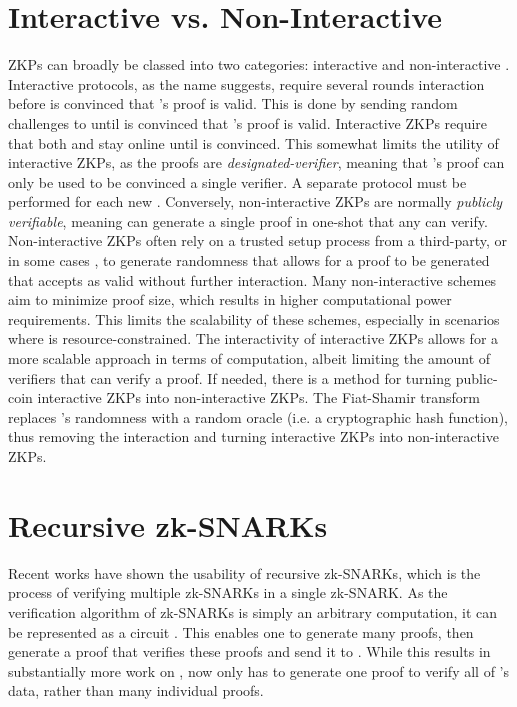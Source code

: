 
\section{Interactive vs. Non-Interactive}
\label{sec:interactive}

ZKPs can broadly be classed into two categories: interactive and non-interactive \cite{wu2014survey}. Interactive protocols, as the name suggests, require several rounds interaction before \Vrf is convinced that \Prv's proof is valid. This is done by \Vrf sending random challenges to \Prv until \Vrf is convinced that \Prv's proof is valid. Interactive ZKPs require that both \Prv and \Vrf stay online until \Vrf is convinced. This somewhat limits the utility of interactive ZKPs, as the proofs are \textit{designated-verifier}, meaning that \Prv's proof can only be used to be convinced a single verifier. A separate protocol must be performed for each new \Vrf. Conversely, non-interactive ZKPs are normally \textit{publicly verifiable}, meaning \Prv can generate a single proof in one-shot that any \Vrf can verify. Non-interactive ZKPs often rely on a trusted setup process from a third-party, or in some cases \Vrf, to generate randomness that allows for a proof to be generated that \Vrf accepts as valid without further interaction. Many non-interactive schemes aim to minimize proof size, which results in higher \Prv computational power requirements. This limits the scalability of these schemes, especially in scenarios where \Prv is resource-constrained. The interactivity of interactive ZKPs allows for a more scalable approach in terms of \Prv computation, albeit limiting the amount of verifiers that can verify a proof. If needed, there is a method for turning public-coin interactive ZKPs into non-interactive ZKPs. The Fiat-Shamir transform \cite{kilian1992note} replaces \Vrf's randomness with a random oracle (i.e. a cryptographic hash function), thus removing the interaction and turning interactive ZKPs into non-interactive ZKPs.

\section{Recursive zk-SNARKs}
\label{sec:recursive}
Recent works \cite{bowe2019recursive, kothapalli2022nova, bitansky2013recursive} have shown the usability of recursive zk-SNARKs, which is the process of verifying multiple zk-SNARKs in a single zk-SNARK. As the verification algorithm of zk-SNARKs is simply an arbitrary computation, it can be represented as a circuit \Cir. This enables one \Prv to generate many proofs, then generate a proof that verifies these proofs and send it to \Vrf. While this results in substantially more work on \Prv, \Vrf now only has to generate one proof to verify all of \Prv's data, rather than many individual proofs. 

